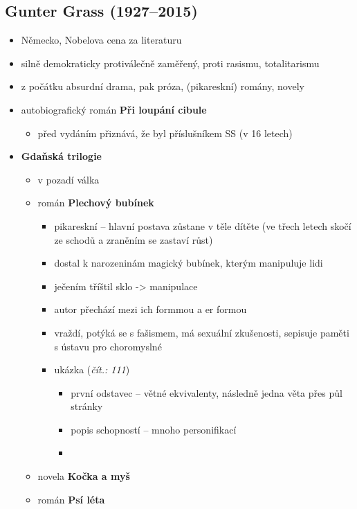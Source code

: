 \subsection{Gunter Grass (1927--2015)}
\begin{itemize}
\item Německo, Nobelova cena za literaturu
\item silně demokraticky protiválečně zaměřený, proti rasismu, totalitarismu
\item z počátku absurdní drama, pak próza, (pikareskní) romány, novely
\item autobiografický román \textbf{Při loupání cibule}
	 \begin{itemize}
	 \item před vydáním přiznává, že byl příslušníkem SS (v 16 letech)
	 \end{itemize}
\item \textbf{Gdaňská trilogie}
	\begin{itemize}
	\item v pozadí válka
	\item román \textbf{Plechový bubínek}
		\begin{itemize}
		\item pikareskní -- hlavní postava zůstane v těle dítěte (ve třech letech skočí ze schodů a zraněním se zastaví růst)
		\item dostal k narozeninám magický bubínek, kterým manipuluje lidi
		\item ječením tříštil sklo -> manipulace
		\item autor přechází mezi ich formmou a er formou
		\item vraždí, potýká se s fašismem, má sexuální zkušenosti, sepisuje paměti s ústavu pro choromyslné
		\item ukázka (\textit{čít.: 111})
			\begin{itemize}
				\item první odstavec -- větné ekvivalenty, následně jedna věta přes půl stránky
				\item popis schopností -- mnoho personifikací
				\item 
			\end{itemize}
		\end{itemize}
	\item novela \textbf{Kočka a myš}
	\item román \textbf{Psí léta}
	\end{itemize}
\end{itemize}

